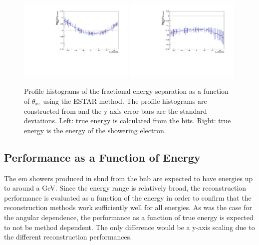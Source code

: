 \begin{figure}[h!]
    \centering
    \includegraphics[width = 0.49\textwidth]{figures-chap4/frac_res_vs_thetaXZ_cheating_electron_vertex_plane2_cut_ESTAR_profile.pdf}
    \includegraphics[width = 0.49\textwidth]{figures-chap4/frac_res_vs_thetaXZ_cheating_electron_vertex_plane2_cut_showeringE_ESTAR_profile.pdf}
    \caption[Profile histograms of the fractional energy separation as a function of $\theta_{xz}$.]{Profile histograms of the fractional energy separation as a function of $\theta_{xz}$ using the ESTAR method. The profile histograms are constructed from  and the y-axis error bars are the standard deviations.  Left: true energy is calculated from the hits. Right: true energy is the energy of the showering electron.}
    \label{fig:reconstruction_as_a_function_of_angle_profile}
\end{figure}

\clearpage
\subsection{Performance as a Function of Energy}
The \gls{em} showers produced in \gls{sbnd} from the \gls{bnb} are expected to have energies up to around a GeV. Since the energy range is relatively broad, the reconstruction performance is evaluated as a function of the energy in order to confirm that the reconstruction methods work sufficiently well for all energies. As was the case for the angular dependence, the performance as a function of true energy is expected to not be method dependent. The only difference would be a y-axis scaling due to the different reconstruction performances. 

